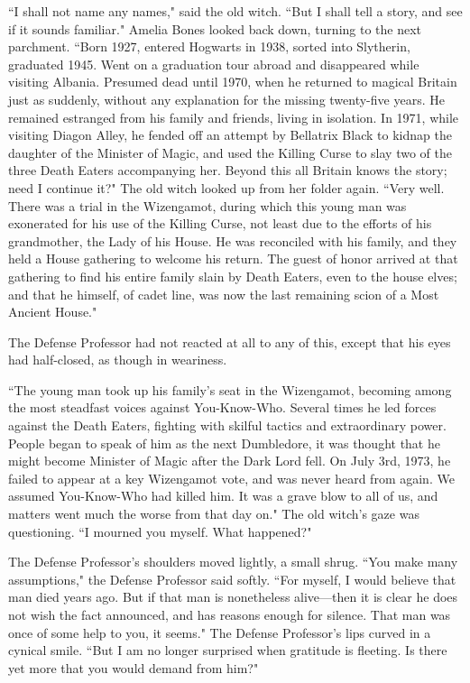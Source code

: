 ``I shall not name any names," said the old witch. ``But I shall tell a story, and see if it sounds familiar." Amelia Bones looked back down, turning to the next parchment. ``Born 1927, entered Hogwarts in 1938, sorted into Slytherin, graduated 1945. Went on a graduation tour abroad and disappeared while visiting Albania. Presumed dead until 1970, when he returned to magical Britain just as suddenly, without any explanation for the missing twenty-five years. He remained estranged from his family and friends, living in isolation. In 1971, while visiting Diagon Alley, he fended off an attempt by Bellatrix Black to kidnap the daughter of the Minister of Magic, and used the Killing Curse to slay two of the three Death Eaters accompanying her. Beyond this all Britain knows the story; need I continue it?" The old witch looked up from her folder again. ``Very well. There was a trial in the Wizengamot, during which this young man was exonerated for his use of the Killing Curse, not least due to the efforts of his grandmother, the Lady of his House. He was reconciled with his family, and they held a House gathering to welcome his return. The guest of honor arrived at that gathering to find his entire family slain by Death Eaters, even to the house elves; and that he himself, of cadet line, was now the last remaining scion of a Most Ancient House."

The Defense Professor had not reacted at all to any of this, except that his eyes had half-closed, as though in weariness.

``The young man took up his family's seat in the Wizengamot, becoming among the most steadfast voices against You-Know-Who. Several times he led forces against the Death Eaters, fighting with skilful tactics and extraordinary power. People began to speak of him as the next Dumbledore, it was thought that he might become Minister of Magic after the Dark Lord fell. On July 3rd, 1973, he failed to appear at a key Wizengamot vote, and was never heard from again. We assumed You-Know-Who had killed him. It was a grave blow to all of us, and matters went much the worse from that day on." The old witch's gaze was questioning. ``I mourned you myself. What happened?"

The Defense Professor's shoulders moved lightly, a small shrug. ``You make many assumptions," the Defense Professor said softly. ``For myself, I would believe that man died years ago. But if that man is nonetheless alive—then it is clear he does not wish the fact announced, and has reasons enough for silence. That man was once of some help to you, it seems." The Defense Professor's lips curved in a cynical smile. ``But I am no longer surprised when gratitude is fleeting. Is there yet more that you would demand from him?"

